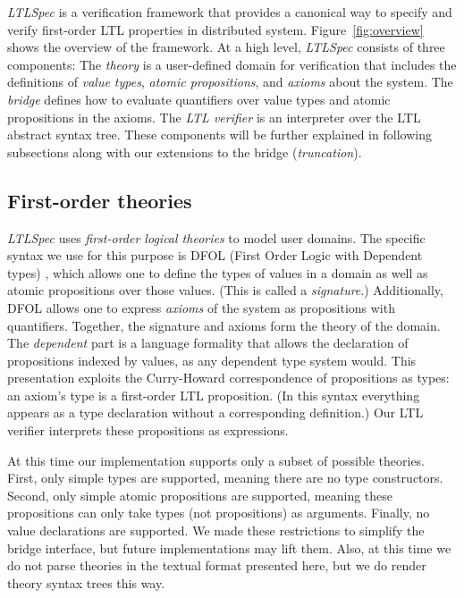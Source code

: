 \documentclass[format=acmsmall, nonacm=true, review=true, screen=true]{acmart}
\newcommand{\ltlspec}{\textit{LTLSpec}\xspace}
\begin{document}
\ltlspec is a verification framework that provides a canonical way to specify and verify first-order LTL properties in distributed system.
Figure~\ref{fig:overview} shows the overview of the framework.
At a high level, \ltlspec consists of three components:
The \textit{theory} is a user-defined domain for verification that includes the definitions of \textit{value types}, \textit{atomic propositions}, and \textit{axioms} about the system.
The \textit{bridge} defines how to evaluate quantifiers over value types and atomic propositions in the axioms.
The \textit{LTL verifier} is an interpreter over the LTL abstract syntax tree.
These components will be further explained in following subsections along with our extensions to the bridge (\textit{truncation}).

\subsection{First-order theories}
\label{subsec:theory}

\ltlspec uses \textit{first-order logical theories} to model user domains.
The specific syntax we use for this purpose is DFOL (First Order Logic with Dependent types) \cite{hutchison_first-order_2006}, which allows one to define the types of values in a domain as well as atomic propositions over those values. (This is called a \textit{signature}.)
Additionally, DFOL allows one to express \textit{axioms} of the system as propositions with quantifiers. Together, the signature and axioms form the theory of the domain. The \textit{dependent} part is a language formality that allows the declaration of propositions indexed by values, as any dependent type system would. This presentation exploits the Curry-Howard correspondence of propositions as types: an axiom's type is a first-order LTL proposition. (In this syntax everything appears as a type declaration without a corresponding definition.) Our LTL verifier interprets these propositions as expressions.

At this time our implementation supports only a subset of possible theories. First, only simple types are supported, meaning there are no type constructors. Second, only simple atomic propositions are supported, meaning these propositions can only take types (not propositions) as arguments. Finally, no value declarations are supported. We made these restrictions to simplify the bridge interface, but future implementations may lift them. Also, at this time we do not parse theories in the textual format presented here, but we do render theory syntax trees this way.
\end{document}
